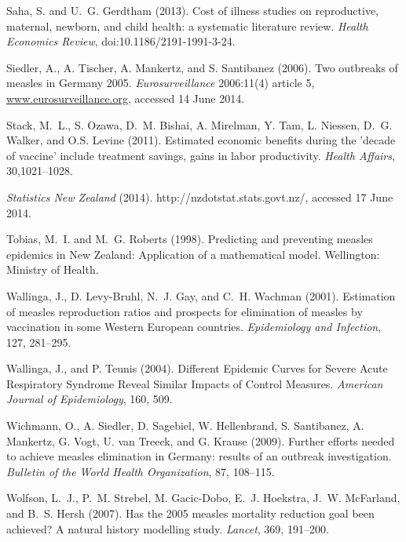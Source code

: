 \documentclass{article}
\begin{document}
\begin{thebibliography}{}
Saha, S. and U.~G. Gerdtham (2013).
\newblock Cost of illness studies on reproductive, maternal, newborn, and child health: a systematic literature review.
\newblock \emph{Health Economics Review}, doi:10.1186/2191-1991-3-24.

Siedler, A., A. Tischer, A. Mankertz, and S. Santibanez (2006).
\newblock Two outbreaks of measles in Germany 2005.
\newblock \emph{Eurosurveillance} 2006:11(4) article 5, \href{http://www.eurosurveillance.org/ViewArticle.aspx?ArticleId=615}{www.eurosurveillance.org}, accessed 14 June 2014.

Stack, M.~L., S. Ozawa, D.~M. Bishai, A. Mirelman, Y. Tam, L. Niessen, D.~G. Walker, and O.S. Levine (2011).
\newblock Estimated economic benefits during the 'decade of vaccine' include treatment savings, gains in labor productivity.
\newblock \emph{Health Affairs}, 30,1021--1028.

\newblock \emph{Statistics New Zealand} (2014).
http://nzdotstat.stats.govt.nz/, accessed 17 June 2014.

Tobias, M.~I. and M.~G. Roberts (1998).
\newblock Predicting and preventing measles epidemics in New Zealand: Application of a mathematical model.
\newblock Wellington: Ministry of Health.

Wallinga, J., D. Levy-Bruhl, N.~J. Gay, and C.~H. Wachman (2001).
\newblock Estimation of measles reproduction ratios and prospects for elimination of measles by vaccination in some Western European countries.
\newblock \emph{Epidemiology and Infection}, 127, 281--295.

Wallinga, J., and P. Teunis (2004).
\newblock Different Epidemic Curves for Severe Acute Respiratory Syndrome Reveal Similar Impacts of Control Measures.
\newblock \emph{American Journal of Epidemiology}, 160, 509.

Wichmann, O., A. Siedler, D. Sagebiel, W. Hellenbrand, S. Santibanez, A. Mankertz, G. Vogt, U. van Treeck, and G. Krause (2009).
\newblock Further efforts needed to achieve measles elimination in Germany: results of an outbreak investigation.
\newblock \emph{Bulletin of the World Health Organization}, 87, 108--115.

Wolfson, L.~J., P.~M. Strebel, M. Gacic-Dobo, E.~J. Hoekstra, J.~W. McFarland, and B.~S. Hersh (2007).
\newblock Has the 2005 measles mortality reduction goal been achieved? A natural history modelling study.
\newblock \emph{Lancet}, 369, 191--200.


\end{thebibliography}
\end{document}
